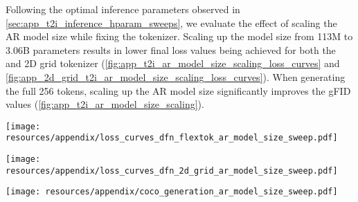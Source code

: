 Following the optimal inference parameters observed in \cref{sec:app_t2i_inference_hparam_sweeps}, we evaluate the effect of scaling the AR model size while fixing the \oursxlarge tokenizer. Scaling up the model size from 113M to 3.06B parameters results in lower final loss values being achieved for both the \ours and 2D grid tokenizer (\cref{fig:app_t2i_ar_model_size_scaling_loss_curves} and \ref{fig:app_2d_grid_t2i_ar_model_size_scaling_loss_curves}). When generating the full 256 tokens, scaling up the AR model size significantly improves the gFID values (\cref{fig:app_t2i_ar_model_size_scaling}).

\begin{figure*}[ht!]
\centering
\texttt{[image: resources/appendix/loss\_curves\_dfn\_flextok\_ar\_model\_size\_sweep.pdf]}
\caption{
\textbf{\ours autoregressive text-conditional image generation loss curves.} The AR models of different sizes shown here are trained for 284B tokens on DFN using the \oursxlarge tokenizer trained on DFN.
}
\label{fig:app_t2i_ar_model_size_scaling_loss_curves}
\end{figure*}

\begin{figure*}[ht!]
\centering
\texttt{[image: resources/appendix/loss\_curves\_dfn\_2d\_grid\_ar\_model\_size\_sweep.pdf]}
\caption{
\textbf{2D grid tokenizer autoregressive text-conditional image generation loss curves.} The AR models of different sizes shown here are trained for 284B tokens on DFN using the \oursxlarge tokenizer trained on DFN.
}
\label{fig:app_2d_grid_t2i_ar_model_size_scaling_loss_curves}
\end{figure*}

\begin{figure*}[ht!]
\centering
\texttt{[image: resources/appendix/coco\_generation\_ar\_model\_size\_sweep.pdf]}
\caption{\textbf{Autoregressive text conditional image generation model scaling.} The gFID values for each model size as functions of the parameter count of the AR model. During AR generation we \textbf{generate 256 tokens so that the \ours and 2D grid tokenizer can be compared} and use the optimal inference parameters detailed in \cref{sec:app_t2i_inference_hparam_sweeps}. The gFID values are measured with respect to the COCO validation set. All AR models are trained using the tokenizers trained on DFN.
}
\label{fig:app_t2i_ar_model_size_scaling}
\end{figure*}






